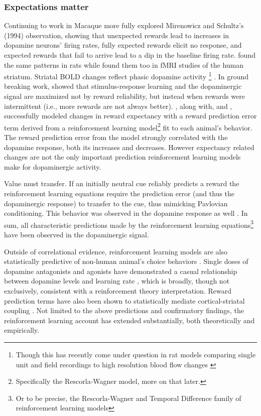 \subsubsection{Expectations matter} %
\label{subsub:expectations}
Continuing to work in Macaque  more fully explored Mirenowicz and Schultz's (1994) observation, showing that unexpected rewards lead to increases in dopamine neurons' firing rates, fully expected rewards elicit no response, and expected rewards that fail to arrive lead to a dip in the baseline firing rate.    found the same patterns in rats while  found them too in fMRI studies of the human striatum.  Striatal BOLD changes reflect phasic dopamine activity \cite{Schonberg:2009p6669,Surmeier:2007p4435}\footnote{
    Though this has recently come under question in rat models comparing single unit and field recordings to high resolution blood flow changes \cite{Mishra:2011p9095}}
. In ground breaking work,  showed that stimulus-response learning and the dopaminergic signal are maximized not by reward reliability, but instead when rewards were intermittent (i.e., more rewards are not always better).  , along with,  and , successfully modeled changes in reward expectancy with a reward prediction error term derived from a reinforcement learning model\footnote{
    Specifically the Rescorla-Wagner model, more on that later.
} fit to each animal's behavior. The reward prediction error from the model strongly correlated with the dopamine response, both its increases and decreases. However expectancy related changes are not the only important prediction reinforcement learning models make for dopaminergic activity.  

Value must transfer.  If an initially neutral cue reliably predicts a reward the reinforcement learning equations require the prediction error (and thus the dopaminergic response) to transfer to the cue, thus mimicking Pavlovian conditioning.  This behavior was observed in the dopamine response as well \cite{Roesch:2007p2519, McClure:2003p3346}.  In sum, all characteristic predictions made by the reinforcement learning equations\footnote{
    Or to be precise, the Rescorla-Wagner and Temporal Difference family of reinforcement learning models} 
have been observed in the dopaminergic signal.  

Outside of correlational evidence, reinforcement learning models are also statistically predictive of non-human animal's choice behaviors \cite{Hampton:2007p2983}.  Single doses of dopamine antagonists and agonists have demonstrated a casual relationship between dopamine levels and learning rate \cite{Pizzagalli:2008p6521, Diaconescu:2010p7631}, which is broadly, though not exclusively, consistent with a reinforcement theory interpretation.  Reward prediction terms have also been shown to statistically mediate cortical-striatal coupling \cite{denOuden:2010p7203}.  Not limited to the above predictions and confirmatory findings, the reinforcement learning account has extended substantially, both theoretically and empirically.


